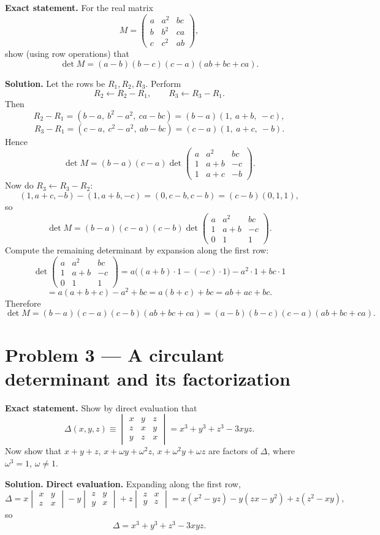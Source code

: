 \documentclass[12pt,a4paper]{article}
\theoremstyle{plain}
\theoremstyle{definition}      %
\begin{document}
\textbf{Exact statement.}
For the real matrix
\[
M=\begin{pmatrix}
	a & a^2 & bc\\
	b & b^2 & ca\\
	c & c^2 & ab
\end{pmatrix},
\]
show (using row operations) that
\[
\det M=(a-b)(b-c)(c-a)(ab+bc+ca).
\]

\textbf{Solution.}
Let the rows be \(R_1,R_2,R_3\). Perform
\[
R_2\leftarrow R_2-R_1,\qquad R_3\leftarrow R_3-R_1.
\]
Then
\[
R_2-R_1=(b-a,\ b^2-a^2,\ ca-bc)=(b-a)(1,\ a+b,\ -c),
\]
\[
R_3-R_1=(c-a,\ c^2-a^2,\ ab-bc)=(c-a)(1,\ a+c,\ -b).
\]
Hence
\[
\det M=(b-a)(c-a)\det\begin{pmatrix}
	a & a^2 & bc\\
	1 & a+b & -c\\
	1 & a+c & -b
\end{pmatrix}.
\]
Now do \(R_3\leftarrow R_3-R_2\):
\[
(1,a+c,-b)-(1,a+b,-c)=(0,c-b,c-b)=(c-b)(0,1,1),
\]
so
\[
\det M=(b-a)(c-a)(c-b)\det\begin{pmatrix}
	a & a^2 & bc\\
	1 & a+b & -c\\
	0 & 1 & 1
\end{pmatrix}.
\]
Compute the remaining determinant by expansion along the first row:
\[
\det\begin{pmatrix}
	a & a^2 & bc\\
	1 & a+b & -c\\
	0 & 1 & 1
\end{pmatrix}
=
a\bigl((a+b)\cdot 1-(-c)\cdot 1\bigr)-a^2\cdot 1+bc\cdot 1
\]
\[
=a(a+b+c)-a^2+bc=a(b+c)+bc=ab+ac+bc.
\]
Therefore
\[
\det M=(b-a)(c-a)(c-b)(ab+bc+ca)=(a-b)(b-c)(c-a)(ab+bc+ca).
\]


\section*{Problem 3 — A circulant determinant and its factorization}

\textbf{Exact statement.}
Show by direct evaluation that
\[
\Delta(x,y,z)\equiv 
\begin{vmatrix}
	x&y&z\\
	z&x&y\\
	y&z&x
\end{vmatrix}
= x^3+y^3+z^3-3xyz.
\]
Now show that \(x+y+z\), \(x+\omega y+\omega^2 z\), \(x+\omega^2 y+\omega z\)
are factors of \(\Delta\), where \(\omega^3=1\), \(\omega\neq 1\).

\textbf{Solution.}
\textbf{Direct evaluation.} Expanding along the first row,
\[
\Delta=
x\begin{vmatrix}x&y\\ z&x\end{vmatrix}
- y\begin{vmatrix}z&y\\ y&x\end{vmatrix}
+ z\begin{vmatrix}z&x\\ y&z\end{vmatrix}
=
x(x^2-yz)-y(zx-y^2)+z(z^2-xy),
\]
so
\[
\Delta=x^3+y^3+z^3-3xyz.
\]
\end{document}
